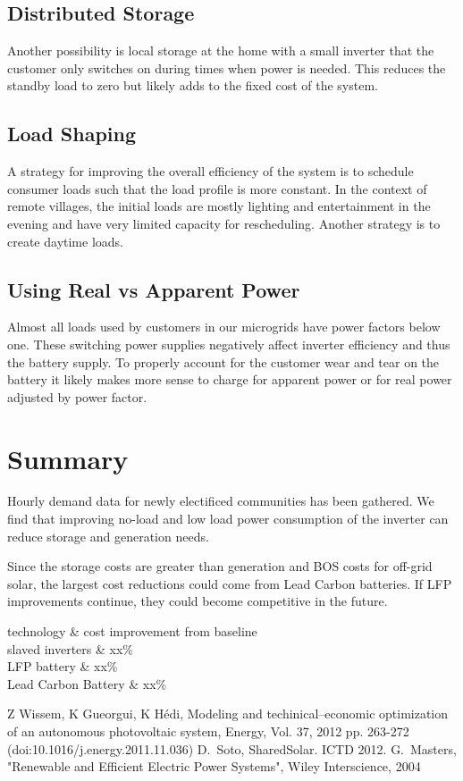 \documentclass[conference]{IEEEtran}
\begin{document}
\subsection{Distributed Storage}
Another possibility is local storage at the home with a small inverter
that the customer only switches on during times when power
is needed.
This reduces the standby load to zero but likely adds to the
fixed cost of the system.

\subsection{Load Shaping}

A strategy for improving the overall efficiency of the system
is to schedule consumer loads such that the load profile is
more constant.
In the context of remote villages, the initial loads are mostly
lighting and entertainment in the evening and have very limited
capacity for rescheduling.
Another strategy is to create daytime loads.


\subsection{Using Real vs Apparent Power}
Almost all loads used by customers in our microgrids have power
factors below one.
These switching power supplies negatively affect inverter efficiency
and thus the battery supply.
To properly account for the customer wear and tear on the battery
it likely makes more sense to charge for apparent power or for
real power adjusted by power factor.

\section{Summary}
Hourly demand data for newly electificed communities has been gathered.
We find that improving no-load and low load power consumption of the
inverter can reduce storage and generation needs.

Since the storage costs are greater than generation and BOS costs
for off-grid solar, the largest cost reductions could come from
Lead Carbon batteries.
If LFP improvements continue, they could become competitive in the
future.



technology \& cost improvement from baseline \\
slaved inverters    \& xx\% \\
LFP battery         \& xx\% \\
Lead Carbon Battery \& xx\% \\


\begin{thebibliography}{1}
Z Wissem, K Gueorgui, K H\'edi,
Modeling and techinical--economic optimization of an autonomous
photovoltaic system,
Energy, Vol. 37, 2012 pp. 263-272
(doi:10.1016/j.energy.2011.11.036)
D.~Soto, SharedSolar. ICTD 2012.
G.~Masters,
"Renewable and Efficient Electric Power Systems",
Wiley Interscience,
2004
\end{thebibliography}
\end{document}
